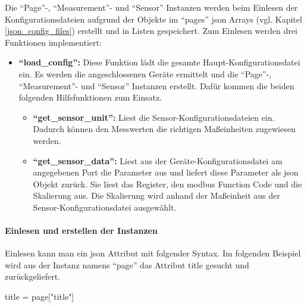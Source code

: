 Die \enquote{Page}-, \enquote{Measurement}- und \enquote{Sensor} Instanzen werden beim Einlesen der Konfigurationsdateien aufgrund der Objekte im \enquote{pages} \acs{json} Arrays (vgl. Kapitel \ref{json_config_files}) erstellt und in Listen gespeichert. \newline
Zum Einlesen werden drei Funktionen implementiert:
\begin{itemize}
	\item \textbf{\enquote{load\_config}:} Diese Funktion lädt die gesamte Haupt-Konfigurationsdatei ein. Es werden die angeschlossenen Geräte ermittelt und die \enquote{Page}-, \enquote{Measurement}- und \enquote{Sensor} Instanzen erstellt. Dafür kommen die beiden folgenden Hilfsfunktionen zum Einsatz.
    \begin{itemize}
		\item \textbf{\enquote{get\_sensor\_unit}:} Liest die Sensor-Konfigurationsdateien ein. Dadurch können den Messwerten die richtigen Maßeinheiten zugewiesen werden.
		\item \textbf{\enquote{get\_sensor\_data}:} Liest aus der Geräte-Konfigurationsdatei am angegebenen Port die Parameter aus und liefert diese Parameter als \acs{json} Objekt zurück. Sie liest das Register, den \gls{modbus} Function Code und die Skalierung aus. Die Skalierung wird anhand der Maßeinheit aus der Sensor-Konfigurationsdatei ausgewählt.
	\end{itemize}
\end{itemize}

\paragraph{Einlesen und erstellen der Instanzen}
Einlesen kann man ein \acs{json} Attribut mit folgender Syntax. Im folgenden Beispiel wird aus der Instanz namens \enquote{page} das Attribut title gesucht und zurückgeliefert.
\begin{pythoncode}
title = page["title"]
\end{pythoncode}

